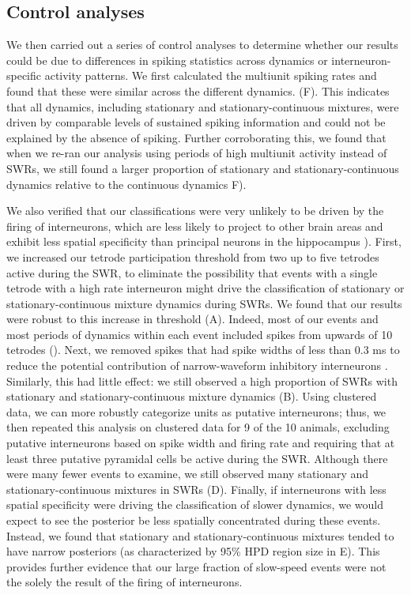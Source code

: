\documentclass[9pt,lineno]{elife}
\begin{document}
\subsection*{Control analyses}

We then carried out a series of control analyses to determine whether our results could be due to differences in spiking statistics across dynamics or interneuron-specific activity patterns. We first calculated the multiunit spiking rates and found that these were similar across the different dynamics. (F). This indicates that all dynamics, including stationary and stationary-continuous mixtures, were driven by comparable levels of sustained spiking information and could not be explained by the absence of spiking. Further corroborating this, we found that when we re-ran our analysis using periods of high multiunit activity instead of SWRs, we still found a larger proportion of stationary and stationary-continuous dynamics relative to the continuous dynamics F).

We also verified that our classifications were very unlikely to be driven by the firing of interneurons, which are less likely to project to other brain areas and exhibit less spatial specificity than principal neurons in the hippocampus \citep{HangyaComplementaryspatialfiring2010, WilentDiscretePlaceFields2007, JinnoNeuronalDiversityGABAergic2007}). First, we increased our tetrode participation threshold from two up to five tetrodes active during the SWR, to eliminate the possibility that events with a single tetrode with a high rate interneuron might drive the classification of stationary or stationary-continuous mixture dynamics during SWRs. We found that our results were robust to this increase in threshold (A). Indeed, most of our events and most periods of dynamics within each event included spikes from upwards of 10 tetrodes (). Next, we removed spikes that had spike widths of less than 0.3 ms to reduce the potential contribution of narrow-waveform inhibitory interneurons \citep{FoxLocalizationanatomicalidentification1975}. Similarly, this had little effect: we still observed a high proportion of SWRs with stationary and stationary-continuous mixture dynamics (B). Using clustered data, we can more robustly categorize units as putative interneurons; thus, we then repeated this analysis on clustered data for 9 of the 10 animals, excluding putative interneurons based on spike width and firing rate and requiring that at least three putative pyramidal cells be active during the SWR. Although there were many fewer events to examine, we still observed many stationary and stationary-continuous mixtures in SWRs (D). Finally, if interneurons with less spatial specificity were driving the classification of slower dynamics, we would expect to see the posterior be less spatially concentrated during these events. Instead, we found that stationary and stationary-continuous mixtures tended to have narrow posteriors (as characterized by 95\% HPD region size in E). This provides further evidence that our large fraction of slow-speed events were not the solely the result of the firing of interneurons. 
\end{document}

